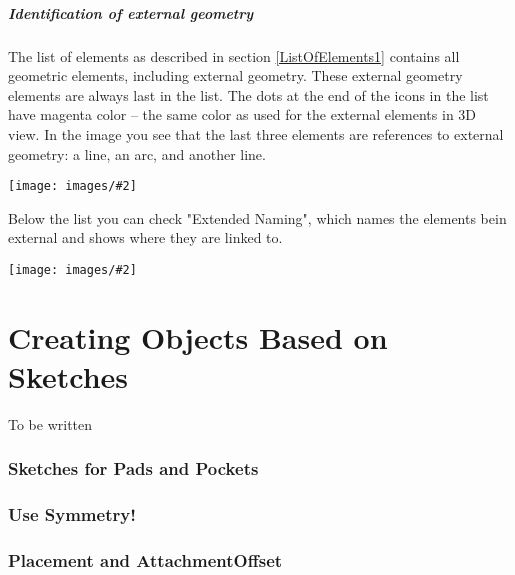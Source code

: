 \documentclass[12pt,titlepage]{article}
\newcommand{\img}[2]{\vspace{2ex}\noindent\texttt{[image: images/\#2]}}
\let\partOrigin\part
\renewcommand\part{\newpage\partOrigin}
\begin{document}
\subsubsection*{Identification of external geometry}
The list of elements as described in section \ref{ListOfElements1}  
contains all geometric elements, including external geometry. These external
geometry elements are always last in the list. The dots at the end of the
icons in the list have magenta color -- the same color as used for the
external elements in 3D view. In the image you see that the last three
elements are references to external geometry: a line, an arc, and another line.

\img{scale=0.8}{ExternalListOfElements}


Below the list you can check "Extended
Naming", which names the elements bein external and shows where they are linked to.

\img{scale=0.8}{ExternalListOfElementsExtended}

\newpage
\part{Creating Objects Based on Sketches}


To be written

\section{Sketches for Pads and Pockets}
\section{Use Symmetry!}
\section{Placement and AttachmentOffset}
\label{SketchPlacement}
\end{document}
